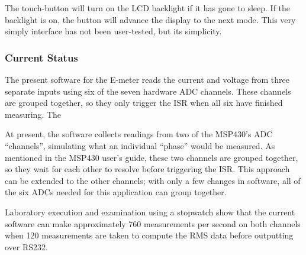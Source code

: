 The touch-button will turn on the \ac{LCD} backlight if it has gone to
sleep. If the backlight is on, the button will advance the display to
the next mode. This very simply interface has not been user-tested,
but its simplicity.

\subsubsection{Current Status}
The present software for the E-meter reads the current and voltage
from three separate inputs using six of the seven hardware \ac{ADC}
channels. These channels are grouped together, so they only trigger
the \ac{ISR} when all six have finished measuring. The

At present, the software collects readings from two of the MSP430's
\ac{ADC} ``channels'', simulating what an individual ``phase'' would
be measured. As mentioned in the MSP430 user's guide, these two
channels are grouped together, so they wait for each other to resolve
before triggering the \ac{ISR}. This approach can be extended to the
other channels; with only a few changes in software, all of the six
\acp{ADC} needed for this application can group together.

Laboratory execution and examination using a stopwatch show that the
current software can make approximately 760 measurements per second on
both channels when 120 measurements are taken to compute the \ac{RMS}
data before outputting over RS232.

